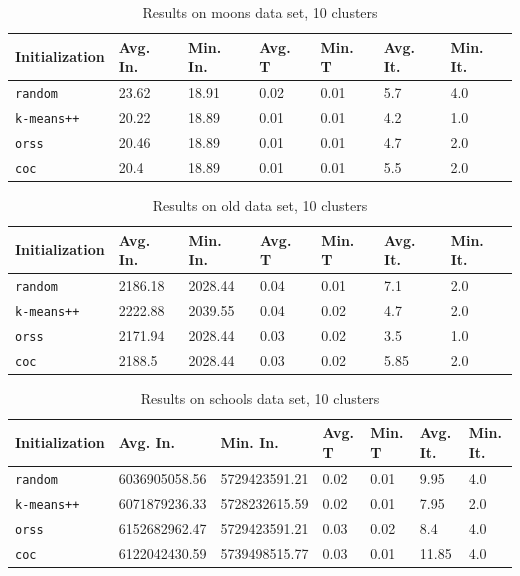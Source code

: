 \documentclass[12pt]{article}
\begin{document}
		\begin{table}[p]
			\begin{center}
				\begin{tabular}{|l|l|l|l|l|l|l|}
					\hline
					Initialization & Avg. In. & Min. In. & Avg. T & Min. T & Avg. It. & Min. It.\\\hline
					\texttt{random} & 23.62 & 18.91 & 0.02 & 0.01 & 5.7 & 4.0\\\hline
					\texttt{k-means++} & 20.22 & 18.89 & 0.01 & 0.01 & 4.2 & 1.0\\\hline
					\texttt{orss} & 20.46 & 18.89 & 0.01 & 0.01 & 4.7 & 2.0\\\hline
					\texttt{coc} & 20.4 & 18.89 & 0.01 & 0.01 & 5.5 & 2.0\\\hline
				\end{tabular}
				\caption{Results on moons data set, 10 clusters}
				\label{tbl:moons10}
			\end{center}
		\end{table}

		\begin{table}[p]
			\begin{center}
				\begin{tabular}{|l|l|l|l|l|l|l|}
					\hline
					Initialization & Avg. In. & Min. In. & Avg. T & Min. T & Avg. It. & Min. It.\\\hline
					\texttt{random} & 2186.18 & 2028.44 & 0.04 & 0.01 & 7.1 & 2.0\\\hline
					\texttt{k-means++} & 2222.88 & 2039.55 & 0.04 & 0.02 & 4.7 & 2.0\\\hline
					\texttt{orss} & 2171.94 & 2028.44 & 0.03 & 0.02 & 3.5 & 1.0\\\hline
					\texttt{coc} & 2188.5 & 2028.44 & 0.03 & 0.02 & 5.85 & 2.0\\\hline
				\end{tabular}
				\caption{Results on old data set, 10 clusters}
				\label{tbl:old10}
			\end{center}
		\end{table}

		\begin{table}[p]
			\begin{center}
				\begin{tabular}{|l|l|l|l|l|l|l|}
					\hline
					Initialization & Avg. In. & Min. In. & Avg. T & Min. T & Avg. It. & Min. It.\\\hline
					\texttt{random} & 6036905058.56 & 5729423591.21 & 0.02 & 0.01 & 9.95 & 4.0\\\hline
					\texttt{k-means++} & 6071879236.33 & 5728232615.59 & 0.02 & 0.01 & 7.95 & 2.0\\\hline
					\texttt{orss} & 6152682962.47 & 5729423591.21 & 0.03 & 0.02 & 8.4 & 4.0\\\hline
					\texttt{coc} & 6122042430.59 & 5739498515.77 & 0.03 & 0.01 & 11.85 & 4.0\\\hline
				\end{tabular}
				\caption{Results on schools data set, 10 clusters}
				\label{tbl:schools10}
			\end{center}
		\end{table}
\end{document}
